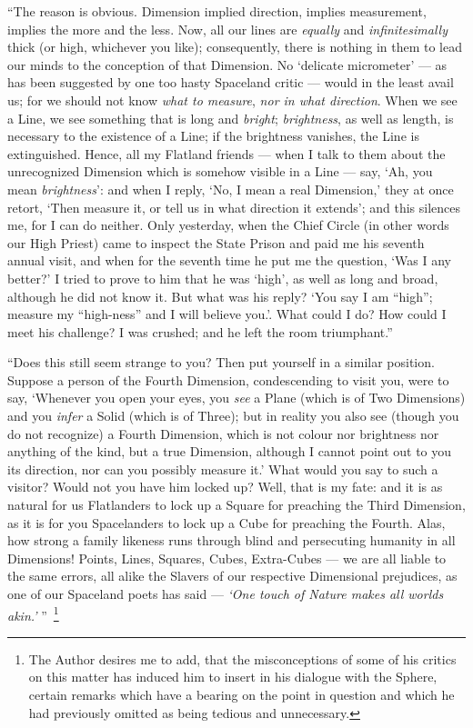 \documentclass[10pt, kindle, oneside]{kindle}
\begin{document}
``The reason is obvious. Dimension implied direction, implies measurement,
implies the more and the less. Now, all our lines are \emph{equally} and
\emph{infinitesimally} thick (or high, whichever you like); consequently, there is
nothing in them to lead our minds to the conception of that Dimension. No
`delicate micrometer' --- as has been suggested by one too hasty Spaceland
critic --- would in the least avail us; for we should not know \emph{what to measure},
\emph{nor in what direction}. When we see a Line, we see something that is long and
\emph{bright}; \emph{brightness}, as well as length, is necessary to the existence of a
Line; if the brightness vanishes, the Line is extinguished. Hence, all my
Flatland friends --- when I talk to them about the unrecognized Dimension which
is somehow visible in a Line --- say, `Ah, you mean \emph{brightness}': and when I
reply, `No, I mean a real Dimension,' they at once retort, `Then measure it,
or tell us in what direction it extends'; and this silences me, for I can do
neither. Only yesterday, when the Chief Circle (in other words our High
Priest) came to inspect the State Prison and paid me his seventh annual visit,
and when for the seventh time he put me the question, `Was I any better?' I
tried to prove to him that he was `high', as well as long and broad, although
he did not know it. But what was his reply? `You say I am ``high''; measure my
``high-ness'' and I will believe you.'. What could I do? How could I meet his
challenge? I was crushed; and he left the room triumphant.''

``Does this still seem strange to you? Then put yourself in a similar position.
Suppose a person of the Fourth Dimension, condescending to visit you, were to
say, `Whenever you open your eyes, you \emph{see} a Plane (which is of Two
Dimensions) and you \emph{infer} a Solid (which is of Three); but in reality you also
see (though you do not recognize) a Fourth Dimension, which is not colour nor
brightness nor anything of the kind, but a true Dimension, although I cannot
point out to you its direction, nor can you possibly measure it.' What would
you say to such a visitor? Would not you have him locked up? Well, that is my
fate: and it is as natural for us Flatlanders to lock up a Square for
preaching the Third Dimension, as it is for you Spacelanders to lock up a Cube
for preaching the Fourth. Alas, how strong a family likeness runs through
blind and persecuting humanity in all Dimensions! Points, Lines, Squares,
Cubes, Extra-Cubes --- we are all liable to the same errors, all alike the
Slavers of our respective Dimensional prejudices, as one of our Spaceland
poets has said --- \emph{`One touch of Nature makes all worlds akin.'} ''~\footnote{The
Author desires me to add, that the misconceptions of some of his critics on
this matter has induced him to insert in his dialogue with
the Sphere, certain remarks which have a bearing on the point in question and
which he had previously omitted as being tedious and unnecessary.}
\end{document}

